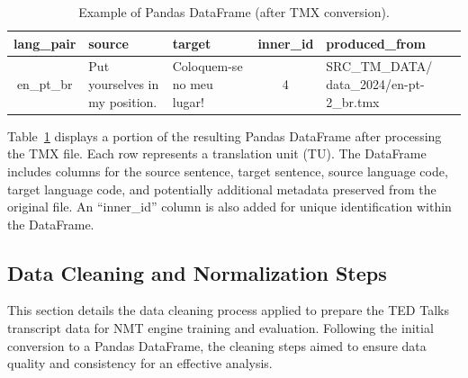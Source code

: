 \begin{table}[htb]
\small
\centering
\begin{tabular}{|c|p{3cm}|p{3cm}|c|p{3cm}|}
\hline
\centering
{\textbf{lang\_pair}} & {\textbf{source}} & {\textbf{target}} & \textbf{inner\_id} & \textbf{produced\_from} \\ \hline\hline
en\_pt\_br & Put yourselves in my position. & Coloquem-se no meu lugar! & 4 & SRC\_TM\_DATA/ data\_2024/en-pt-2\_br.tmx \\ \hline
\end{tabular}
\caption{Example of Pandas DataFrame (after TMX conversion).}
\label{tab:example-pandas}
\end{table}

Table~\ref{tab:example-pandas} displays a portion of the resulting Pandas DataFrame after processing the TMX file. Each row represents a translation unit (TU). The DataFrame includes columns for the source sentence, target sentence, source language code, target language code, and potentially additional metadata preserved from the original file. An ``inner\_id'' column is also added for unique identification within the DataFrame.


\subsection{Data Cleaning and Normalization Steps}

This section details the data cleaning process applied to prepare the TED Talks transcript data for NMT engine training and evaluation. Following the initial conversion to a Pandas DataFrame, the cleaning steps aimed to ensure data quality and consistency for an effective analysis.

